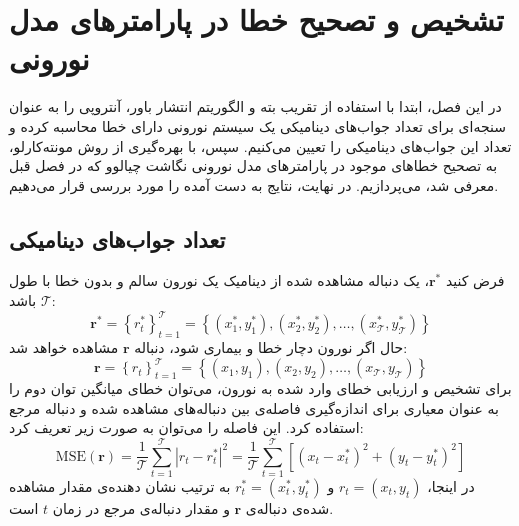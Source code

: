 \chapter{تشخیص و تصحیح خطا در پارامترهای مدل نورونی} \label{chap:errors}

در این فصل، ابتدا با استفاده از تقریب بته و الگوریتم انتشار باور، آنتروپی را به عنوان سنجه‌ای برای تعداد جواب‌های دینامیکی یک سیستم نورونی دارای خطا محاسبه کرده و تعداد این جواب‌های دینامیکی را تعیین می‌کنیم.
سپس، با بهره‌گیری از روش مونته‌کارلو، به تصحیح خطاهای موجود در پارامترهای مدل نورونی نگاشت چیالوو که در فصل قبل معرفی شد، می‌پردازیم.
در نهایت، نتایج به دست آمده را مورد بررسی قرار می‌دهیم.

\section{تعداد جواب‌های دینامیکی}
فرض کنید
\( \mathbf{r}^{*} \)،
یک دنباله مشاهده شده از دینامیک یک نورون سالم و بدون خطا با طول
\( \mathcal{T} \)
باشد:
\begin{equation}
    \mathbf{r}^{*} = \left\{ r^{*}_{t} \right\}_{t=1}^{\mathcal{T}} = \left\{ \left( x_{1}^{*}, y_{1}^{*} \right) , \left( x_{2}^{*}, y_{2}^{*} \right), \ldots, \left( x_{\mathcal{T}}^{*}, y_{\mathcal{T}}^{*} \right) \right\}
\end{equation}
حال اگر نورون دچار خطا و بیماری شود، دنباله
\( \mathbf{r} \)
مشاهده خواهد شد:
\begin{equation}
    \mathbf{r} = \left\{ r_{t} \right\}_{t=1}^{\mathcal{T}} = \left\{ \left( x_{1}, y_{1} \right) , \left( x_{2}, y_{2} \right), \ldots, \left( x_{\mathcal{T}}, y_{\mathcal{T}} \right) \right\}
\end{equation}
برای تشخیص و ارزیابی خطای وارد شده به نورون، می‌توان خطای میانگین توان دوم  را به عنوان معیاری برای اندازه‌گیری فاصله‌ی بین دنباله‌های مشاهده شده و دنباله مرجع استفاده کرد.
این فاصله را می‌توان به صورت زیر تعریف کرد:
\begin{equation} \label{eq:mse}
    \text{MSE}(\mathbf{r}) = \frac{1}{\mathcal{T}} \sum_{t=1}^{\mathcal{T}} |r_{t} - r^{*}_{t}|^{2} = \frac{1}{\mathcal{T}} \sum_{t=1}^{\mathcal{T}} \left[ (x_{t} - x^{*}_{t})^{2} + (y_{t} - y^{*}_{t})^{2} \right]
\end{equation}
در اینجا،
\( r_{t} = (x_{t}, y_{t}) \) و \( r^{*}_{t} = (x^{*}_{t}, y^{*}_{t}) \)
به ترتیب نشان دهنده‌ی مقدار مشاهده شده‌ی دنباله‌ی
\( \mathbf{r} \)
و مقدار دنباله‌ی مرجع در زمان
\( t \)
است.

